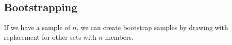 
\subsection{Bootstrapping}

If we have a sample of \(n\), we can create bootstrap samples by drawing with replacement for other sets with \(n\) members.

